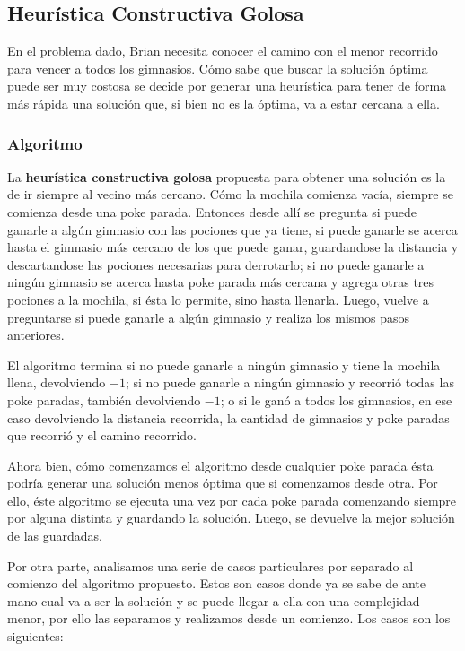 \subsection{Heurística Constructiva Golosa}

En el problema dado, Brian necesita conocer el camino con el menor recorrido para vencer a todos los gimnasios. Cómo sabe que buscar la solución óptima puede ser muy costosa se decide por generar una heurística para tener de forma más rápida una solución que, si bien no es la óptima, va a estar cercana a ella.


\subsubsection{Algoritmo}

La \textbf{heurística constructiva golosa} propuesta para obtener una solución es la de ir siempre al vecino más cercano. Cómo la mochila comienza vacía, siempre se comienza desde una poke parada. Entonces desde allí se pregunta si puede ganarle a algún gimnasio con las pociones que ya tiene, si puede ganarle se acerca hasta el gimnasio más cercano de los que puede ganar, guardandose la distancia y descartandose las pociones necesarias para derrotarlo; si no puede ganarle a ningún gimnasio se acerca hasta poke parada más cercana y agrega otras tres pociones a la mochila, si ésta lo permite, sino hasta llenarla. Luego, vuelve a preguntarse si puede ganarle a algún gimnasio y realiza los mismos pasos anteriores.

El algoritmo termina si no puede ganarle a ningún gimnasio y tiene la mochila llena, devolviendo $-1$; si no puede ganarle a ningún gimnasio y recorrió todas las poke paradas, también devolviendo $-1$; o si le ganó a todos los gimnasios, en ese caso devolviendo la distancia recorrida, la cantidad de gimnasios y poke paradas que recorrió y el camino recorrido.

Ahora bien, cómo comenzamos el algoritmo desde cualquier poke parada ésta podría generar una solución menos óptima que si comenzamos desde otra. Por ello, éste algoritmo se ejecuta una vez por cada poke parada comenzando siempre por alguna distinta y guardando la solución. Luego, se devuelve la mejor solución de las guardadas. 

Por otra parte, analisamos una serie de casos particulares por separado al comienzo del algoritmo propuesto. Estos son casos donde ya se sabe de ante mano cual va a ser la solución y se puede llegar a ella con una complejidad menor, por ello las separamos y realizamos desde un comienzo. Los casos son los siguientes:

